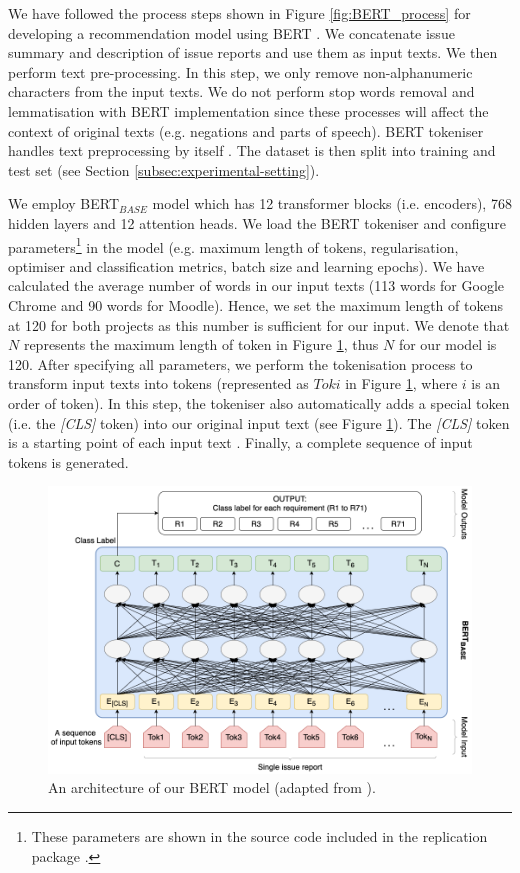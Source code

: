 We have followed the process steps shown in Figure \ref{fig:BERT_process} for developing a recommendation model using BERT . We concatenate issue summary and description of issue reports and use them as input texts. We then perform text pre-processing. In this step, we only remove non-alphanumeric characters from the input texts. We do not perform stop words removal and lemmatisation with BERT implementation since these processes will affect the context of original texts (e.g. negations and parts of speech). BERT tokeniser handles text preprocessing by itself \cite{Huggingface2020, Reina2020}. The dataset is then split into training and test set (see Section \ref{subsec:experimental-setting}).

We employ BERT$_{BASE}$ model which has 12 transformer blocks (i.e. encoders), 768 hidden layers and 12 attention heads. We load the BERT tokeniser and configure parameters\footnote{These parameters are shown in the source code included in the replication package \cite{msrreplipkg}.} in the model (e.g. maximum length of tokens, regularisation, optimiser and classification metrics, batch size and learning epochs). We have calculated the average number of words in our input texts (113 words for Google Chrome and 90 words for Moodle). Hence, we set the maximum length of tokens at 120 for both projects as this number is sufficient for our input. We denote that $N$ represents the maximum length of token in Figure \ref{fig:BERT_architecture}, thus $N$ for our model is 120. After specifying all parameters, we perform the tokenisation process to transform input texts into tokens (represented as $Tok i$ in Figure \ref{fig:BERT_architecture}, where $i$ is an order of token). In this step, the tokeniser also automatically adds a special token (i.e. the \emph{[CLS]} token) into our original input text (see Figure \ref{fig:BERT_architecture}). The \emph{[CLS]} token is a starting point of each input text \cite{Devlin2018}. Finally, a complete sequence of input tokens is generated.

\begin{figure}[ht]
	\centering
	\includegraphics[width=1.0\linewidth]{"Figures/BERT_architecture"}
	\caption{An architecture of our BERT model (adapted from \cite{Devlin2018}).}
	\label{fig:BERT_architecture}
\end{figure}

